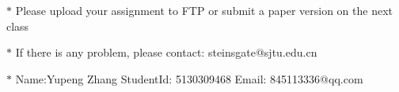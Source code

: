\documentclass[12pt,a4paper]{article}
\theoremstyle{definition}
\numberwithin{equation}{section}
\numberwithin{figure}{section}
\begin{document}
\noindent

\noindent{}
\begin{center}
\footnotesize{\color{red}$*$ Please upload your assignment to FTP or submit a paper version on the next class}

\footnotesize{\color{red}$*$ If there is any problem, please contact: steinsgate@sjtu.edu.cn}

\footnotesize{\color{blue}$*$ Name:Yupeng Zhang \quad StudentId: 5130309468 \quad Email: 845113336@qq.com}
\end{center}
\end{document}
